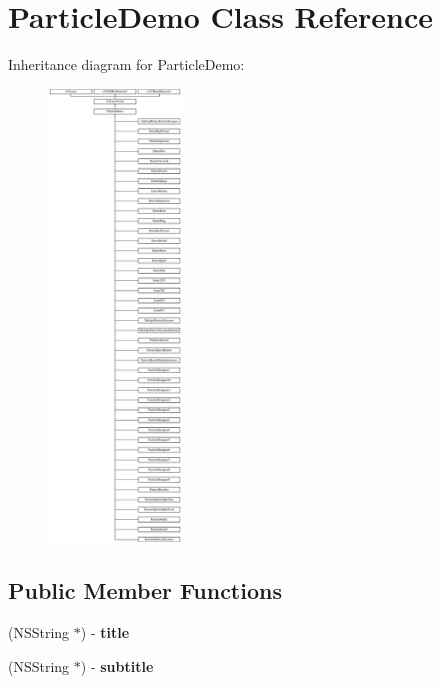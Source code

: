 \hypertarget{interface_particle_demo}{\section{Particle\-Demo Class Reference}
\label{interface_particle_demo}
}
Inheritance diagram for Particle\-Demo\-:\begin{figure}[H]
\begin{center}
\leavevmode
\includegraphics[height=12.000000cm]{interface_particle_demo}
\end{center}
\end{figure}
\subsection*{Public Member Functions}
\begin{DoxyCompactItemize}
\item 
\hypertarget{interface_particle_demo_ad93b79204a81a37133ee9cbadce81a54}{(N\-S\-String $\ast$) -\/ {\bfseries title}}\label{interface_particle_demo_ad93b79204a81a37133ee9cbadce81a54}

\item 
\hypertarget{interface_particle_demo_a364afb960f06d9044f7a49daa4b28c3e}{(N\-S\-String $\ast$) -\/ {\bfseries subtitle}}\label{interface_particle_demo_a364afb960f06d9044f7a49daa4b28c3e}

\end{DoxyCompactItemize}
